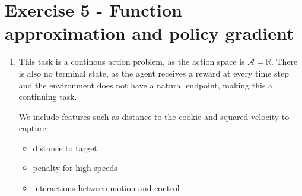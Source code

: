 \documentclass{article}
\begin{document}
\section*{Exercise 5 - Function approximation and policy gradient}
\begin{enumerate}
    \item This task is a continous action problem, as the action space is $\mathcal{A} = \mathbb{R}$. There is also no terminal state, as the agent receives a reward at every time step and the environment does not have a natural endpoint, making this a continuing task.
    
    We include features such as distance to the cookie and squared velocity to capture:
    \begin{itemize}
        \item distance to target
        \item penalty for high speeds
        \item interactions between motion and control
    \end{itemize}
\end{enumerate}
\end{document}
